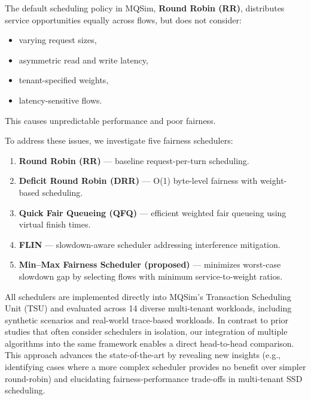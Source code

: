 \documentclass[11pt]{article}
\begin{document}
The default scheduling policy in MQSim, \textbf{Round Robin (RR)}, distributes service opportunities equally across flows, but does not consider:
\begin{itemize}
    \item varying request sizes,
    \item asymmetric read and write latency,
    \item tenant-specified weights,
    \item latency-sensitive flows.
\end{itemize}
This causes unpredictable performance and poor fairness.

To address these issues, we investigate five fairness schedulers:
\begin{enumerate}
    \item \textbf{Round Robin (RR)} — baseline request-per-turn scheduling.
    \item \textbf{Deficit Round Robin (DRR)} — O(1) byte-level fairness with weight-based scheduling.
    \item \textbf{Quick Fair Queueing (QFQ)} — efficient weighted fair queueing using virtual finish times.
    \item \textbf{FLIN} — slowdown-aware scheduler addressing interference mitigation.
    \item \textbf{Min--Max Fairness Scheduler (proposed)} — minimizes worst-case slowdown gap by selecting flows with minimum service-to-weight ratios.
\end{enumerate}

All schedulers are implemented directly into MQSim's Transaction Scheduling Unit (TSU) and evaluated across 14 diverse multi-tenant workloads, including synthetic scenarios and real-world trace-based workloads. In contrast to prior studies that often consider schedulers in isolation, our integration of multiple algorithms into the same framework enables a direct head-to-head comparison. This approach advances the state-of-the-art by revealing new insights (e.g., identifying cases where a more complex scheduler provides no benefit over simpler round-robin) and elucidating fairness-performance trade-offs in multi-tenant SSD scheduling.
\end{document}
